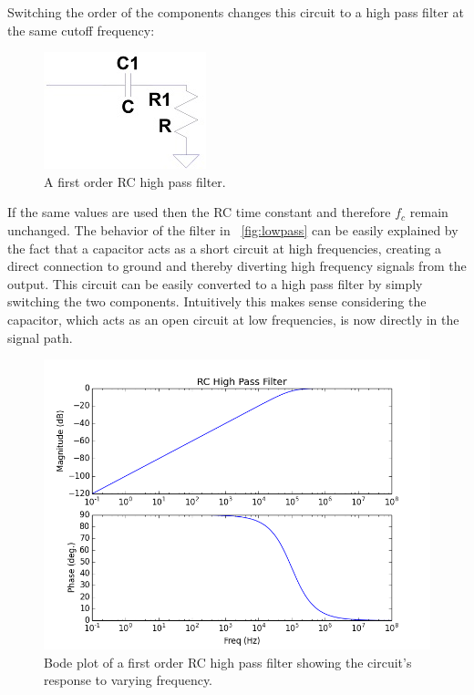 \documentclass[11pt]{article}
\begin{document}
    Switching the order of the components changes this circuit to a high pass filter at the same cutoff frequency:
    
    \begin{figure}[h!]
    \centering
    \includegraphics[scale=1.7]{highpass.jpg}
    \caption{A first order RC high pass filter.}
    \label{fig:highpass}
    \end{figure}
    
    If the same values are used then the RC time constant and therefore $f_c$ remain unchanged. The behavior of the filter in ~\ref{fig:lowpass} can be easily explained by the fact that a capacitor acts as a short circuit at high frequencies, creating a direct connection to ground and thereby diverting high frequency signals from the output. This circuit can be easily converted to a high pass filter by simply switching the two components. Intuitively this makes sense considering the capacitor, which acts as an open circuit at low frequencies, is now directly in the signal path.
    
    \begin{figure}[h!]
    \centering
    \includegraphics[scale=0.5]{rc_high_pass.png}
    \caption{Bode plot of a first order RC high pass filter showing the circuit's response to varying frequency.}
    \label{fig:highpass_bode}
    \end{figure}
    
\end{document}
